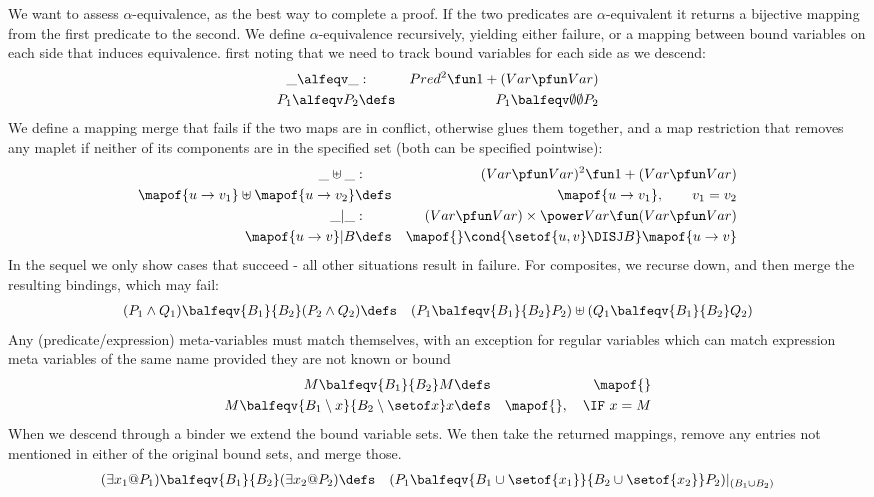 We want to assess $\alpha$-equivalence,
as the best way to complete a proof.
If the two predicates are $\alpha$-equivalent it returns
a bijective mapping from the first predicate to the second.
We define $\alpha$-equivalence recursively,
yielding either failure, or a mapping between bound variables
on each side that induces equivalence.
first noting that we need to track bound variables for each side
as we descend:
\begin{eqnarray*}
   \_\alfeqv\_ &:& Pred^2 \fun 1 + (Var \pfun Var)
\\ P_1 \alfeqv P_2
   &\defs&
   P_1 \balfeqv\emptyset\emptyset P_2
\end{eqnarray*}
We define a mapping merge that fails if the two maps are in conflict,
otherwise glues them together,
and a map restriction that removes any maplet
if neither of its components are in the specified set
(both can be specified pointwise):
\begin{eqnarray*}
 \_\uplus\_ &:& (Var \pfun Var)^2 \fun 1 + (Var \pfun Var)
\\ \mapof{u \to v_1} \uplus \mapof{u \to v_2}
   &\defs& \mapof{u \to v_1}, \qquad v_1 = v_2
\\ \_|\_ &:& (Var \pfun Var) \times \power Var \fun (Var \pfun Var)
\\ \mapof{u \to v} | B
   &\defs&
   \mapof{} \cond{\setof{u,v} \DISJ B} \mapof{u \to v}
\end{eqnarray*}
In the sequel we only show cases that succeed - all other situations
result in failure.
For composites, we recurse down,
and then merge the resulting bindings,
which may fail:
\begin{eqnarray*}
   (P_1 \land Q_1) \balfeqv{B_1}{B_2} (P_2 \land Q_2)
   &\defs&
   (P_1 \balfeqv{B_1}{B_2} P_2)
   \uplus
   (Q_1 \balfeqv{B_1}{B_2} Q_2)
\end{eqnarray*}
Any (predicate/expression) meta-variables must match themselves,
with an exception for regular variables
which can match expression meta variables of the same name
provided they are not known or bound
\begin{eqnarray*}
   M \balfeqv{B_1}{B_2} M &\defs& \mapof{}
\\ M \balfeqv{B_1 \setminus x}{B_2\setminus \setof x} x &\defs& \mapof{}, \quad \IF~x=M
\end{eqnarray*}
When we descend through a binder
we extend the bound variable sets.
We then take the returned mappings,
remove any entries not mentioned in either of the original bound sets,
and merge those.
\begin{eqnarray*}
   (\exists x_1 @ P_1) \balfeqv{B_1}{B_2} (\exists x_2 @ P_2)
   &\defs&
   (P_1 \balfeqv{B_1 \cup \setof{x_1}}{B_2\cup\setof{x_2}} P_2)
   |_{(B_1 \cup B_2)}
\end{eqnarray*}
